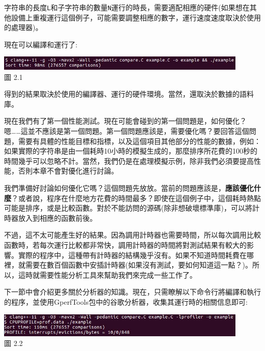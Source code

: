 字符串的長度\texttt{L}和子字符串的數量\texttt{N}運行的時長，需要適配相應的硬件(如果想在其他設備上重複運行這個例子，可能需要調整相應的數字，運行速度速度取決於使用的處理器)。

現在可以編譯和運行了:

\begin{center}
\includegraphics[width=0.9\textwidth]{content/1/chapter2/images/1.jpg}\\
圖 2.1
\end{center}

得到的結果取決於使用的編譯器、運行的硬件環境。當然，還取決於數據的語料庫。

現在我們有了第一個性能測試。現在可能會碰到的第一個問題是，如何優化？嗯……這並不應該是第一個問題。第一個問題應該是，需要優化嗎？要回答這個問題，需要有具體的性能目標和指標，以及這個項目其他部分的性能的數據，例如：如果實際的字符串是由一個耗時10小時的模擬生成的，那麼排序所花費的100秒的時間幾乎可以忽略不計。當然，我們仍是在處理模擬示例，除非我們必須要提高性能，否則本章不會對優化進行討論。

我們準備好討論如何優化它嗎？這個問題先放放。當前的問題應該是，\textbf{應該優化什麼}？或者說，程序在什麼地方花費的時間最多？即使在這個例子中，這個耗時熱點可能是排序，或是比較函數。對於不能訪問的源碼(除非想破壞標準庫)，可以將計時器放入到相應的函數前後。

不過，這不太可能產生好的結果。因為調用計時器也需要時間，所以每次調用比較函數時，若每次運行比較都非常快，調用計時器的時間將對測試結果有較大的影響。實際的程序中，這種帶有計時器的結構幾乎沒有。如果不知道時間耗費在哪裡，就需要在數百個函數中安插計時器(如果沒有測試，要如何知道這一點？)。所以，這時就需要性能分析工具來幫助我們來完成一些工作了。

下一節中會介紹更多關於分析器的知識。現在，只需瞭解以下命令行將編譯和執行的程序，並使用GperfTools包中的谷歌分析器，收集其運行時的相關信息即可:

\begin{center}
\includegraphics[width=0.9\textwidth]{content/1/chapter2/images/2.jpg}\\
圖 2.2
\end{center}


